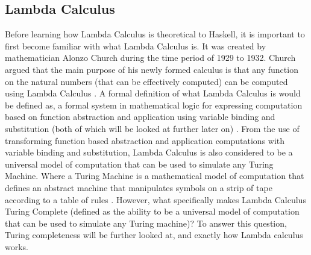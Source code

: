 \documentclass{article}
\begin{document}
\subsection{Lambda Calculus}
Before learning how Lambda Calculus is theoretical to Haskell, it is important to first become familiar with what Lambda Calculus is.
It was created by mathematician Alonzo Church during the time period of 1929 to 1932.
Church argued that the main purpose of his newly formed calculus is that any function on the natural numbers (that can be effectively computed) can be computed using Lambda Calculus \cite{6}.
A formal definition of what Lambda Calculus is would be defined as, a formal system in mathematical logic for expressing computation based on function abstraction and application using variable binding and substitution (both of which will be looked at further later on) \cite{7}.
From the use of transforming function based abstraction and application computations with variable binding and substitution, Lambda Calculus is also considered to be a universal model of computation that can be used to simulate any Turing Machine.
Where a Turing Machine is a mathematical model of computation that defines an abstract machine that manipulates symbols on a strip of tape according to a table of rules \cite{8}. However, what specifically makes Lambda Calculus Turing Complete (defined as the ability to be a universal model of computation that can be used to simulate any Turing machine)? To answer this question, Turing completeness will be further looked at, and exactly how Lambda calculus works.
\end{document}
